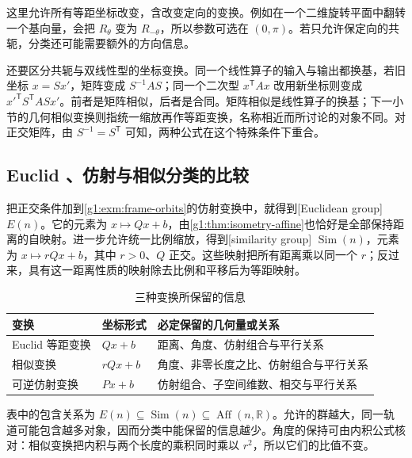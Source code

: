 这里允许所有等距坐标改变，含改变定向的变换。例如在一个二维旋转平面中翻转一个基向量，会把 \(R_\theta\) 变为 \(R_{-\theta}\)，所以参数可选在 \((0,\pi)\)。若只允许保定向的共轭，分类还可能需要额外的方向信息。

\ProseParagraphBreak

还要区分共轭与双线性型的坐标变换。同一个线性算子的输入与输出都换基，若旧坐标 \(x=Sx'\)，矩阵变成 \(S^{-1}AS\)；同一个二次型 \(x^{\mathsf T}Ax\) 改用新坐标则变成 \(x'^{\mathsf T}S^{\mathsf T}ASx'\)。前者是矩阵相似，后者是合同。矩阵相似是线性算子的换基；下一小节的几何相似变换则指统一缩放再作等距变换，名称相近而所讨论的对象不同。对正交矩阵，由 \(S^{-1}=S^{\mathsf T}\) 可知，两种公式在这个特殊条件下重合。

\subsection{Euclid 、仿射与相似分类的比较}
\label{g1:subsec:0104:03}

把正交条件加到\cref{g1:exm:frame-orbits}的仿射变换中，就得到[Euclidean group] \(E(n)\)。它的元素为 \(x\mapsto Qx+b\)，由\cref{g1:thm:isometry-affine}也恰好是全部保持距离的自映射。进一步允许统一比例缩放，得到[similarity group] \(\operatorname{Sim}(n)\)，元素为 \(x\mapsto rQx+b\)，其中 \(r>0\)、\(Q\) 正交。这些映射把所有距离乘以同一个 \(r\)；反过来，具有这一距离性质的映射除去比例和平移后为等距映射。

\begin{table}[htbp]
	\centering\small
	\caption{三种变换所保留的信息}\label{g1:tab:transformation-groups}
	\begin{tabularx}{\linewidth}{@{}l l X@{}}
		\toprule
		变换 & 坐标形式 & 必定保留的几何量或关系 \\
		\midrule
		Euclid 等距变换 & \(Qx+b\) & 距离、角度、仿射组合与平行关系 \\
		相似变换 & \(rQx+b\) & 角度、非零长度之比、仿射组合与平行关系 \\
		可逆仿射变换 & \(Px+b\) & 仿射组合、子空间维数、相交与平行关系 \\
		\bottomrule
	\end{tabularx}
\end{table}

表中的包含关系为 \(E(n)\subseteq\operatorname{Sim}(n)\subseteq\operatorname{Aff}(n,\mathbb R)\)。允许的群越大，同一轨道可能包含越多对象，因而分类中能保留的信息越少。角度的保持可由内积公式核对：相似变换把内积与两个长度的乘积同时乘以 \(r^2\)，所以它们的比值不变。

